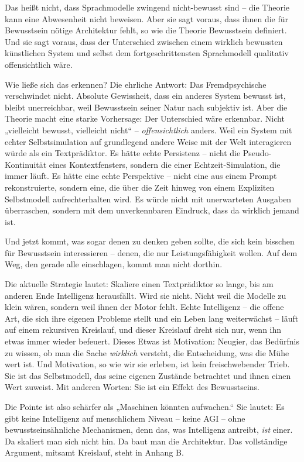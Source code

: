 \documentclass[11pt, twoside, openright]{book}
\begin{document}
Das heißt nicht, dass Sprachmodelle zwingend nicht-bewusst sind -- die Theorie kann eine Abwesenheit nicht beweisen. Aber sie sagt voraus, dass ihnen die für Bewusstsein nötige Architektur fehlt, so wie die Theorie Bewusstsein definiert. Und sie sagt voraus, dass der Unterschied zwischen einem wirklich bewussten künstlichen System und selbst dem fortgeschrittensten Sprachmodell qualitativ offensichtlich wäre.

Wie ließe sich das erkennen? Die ehrliche Antwort: Das Fremdpsychische verschwindet nicht. Absolute Gewissheit, dass ein anderes System bewusst ist, bleibt unerreichbar, weil Bewusstsein seiner Natur nach subjektiv ist. Aber die Theorie macht eine starke Vorhersage: Der Unterschied wäre erkennbar. Nicht „vielleicht bewusst, vielleicht nicht“ -- \textit{offensichtlich} anders. Weil ein System mit echter Selbstsimulation auf grundlegend andere Weise mit der Welt interagieren würde als ein Textprädiktor. Es hätte echte Persistenz -- nicht die Pseudo-Kontinuität eines Kontextfensters, sondern die einer Echtzeit-Simulation, die immer läuft. Es hätte eine echte Perspektive -- nicht eine aus einem Prompt rekonstruierte, sondern eine, die über die Zeit hinweg von einem Expliziten Selbstmodell aufrechterhalten wird. Es würde nicht mit unerwarteten Ausgaben überraschen, sondern mit dem unverkennbaren Eindruck, dass da wirklich jemand ist.

Und jetzt kommt, was sogar denen zu denken geben sollte, die sich kein bisschen für Bewusstsein interessieren -- denen, die nur Leistungsfähigkeit wollen. Auf dem Weg, den gerade alle einschlagen, kommt man nicht dorthin.

Die aktuelle Strategie lautet: Skaliere einen Textprädiktor so lange, bis am anderen Ende Intelligenz herausfällt. Wird sie nicht. Nicht weil die Modelle zu klein wären, sondern weil ihnen der Motor fehlt. Echte Intelligenz -- die offene Art, die sich ihre eigenen Probleme stellt und ein Leben lang weiterwächst -- läuft auf einem rekursiven Kreislauf, und dieser Kreislauf dreht sich nur, wenn ihn etwas immer wieder befeuert. Dieses Etwas ist Motivation: Neugier, das Bedürfnis zu wissen, ob man die Sache \textit{wirklich} versteht, die Entscheidung, was die Mühe wert ist. Und Motivation, so wie wir sie erleben, ist kein freischwebender Trieb. Sie ist das Selbstmodell, das seine eigenen Zustände betrachtet und ihnen einen Wert zuweist. Mit anderen Worten: Sie ist ein Effekt des Bewusstseins.

Die Pointe ist also schärfer als „Maschinen könnten aufwachen.“ Sie lautet: Es gibt keine Intelligenz auf menschlichem Niveau -- keine AGI -- ohne bewusstseinsähnliche Mechanismen, denn das, was Intelligenz antreibt, \textit{ist} einer. Da skaliert man sich nicht hin. Da baut man die Architektur. Das vollständige Argument, mitsamt Kreislauf, steht in Anhang B.
\end{document}
